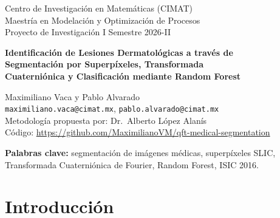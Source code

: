 \documentclass[11pt,a4paper]{article}
\newcommand{\pendiente}[1]{\textcolor{red}{[#1]}}
\newcommand{\RESUMENRESULTADOS}{\pendiente{IoU y Dice promedio pendientes}}
\begin{document}
\begin{center}
  {\large Centro de Investigación en Matemáticas (CIMAT)}\\[2pt]
  Maestría en Modelación y Optimización de Procesos\\[2pt]
  \small Proyecto de Investigación I \hfill Semestre 2026-II\\[14pt]
  {\LARGE\bfseries Identificación de Lesiones Dermatológicas a través de\\[3pt]
   Segmentación por Superpíxeles, Transformada\\[3pt]
   Cuaterniónica y Clasificación mediante Random Forest\par}
  \vspace{12pt}
  Maximiliano Vaca \quad y \quad Pablo Alvarado\\[2pt]
  \small\texttt{maximiliano.vaca@cimat.mx}, \texttt{pablo.alvarado@cimat.mx}\\[2pt]
  \small Metodología propuesta por: Dr.\ Alberto López Alanís\\[2pt]
  \small Código: \url{https://github.com/MaximilianoVM/qft-medical-segmentation}
\end{center}

\begin{abstract}
\noindent
Se presenta un sistema automatizado para segmentar lesiones cutáneas en imágenes
dermatoscópicas. El método divide cada imagen en $k = 85$ superpíxeles con SLIC,
representa el color RGB de cada píxel como un cuaternión puro, aplica la
Transformada Cuaterniónica de Fourier 2D (QFT) sobre cada superpíxel y resume su
espectro en cinco descriptores (magnitud media, desviación estándar, máximo,
energía y entropía). Un clasificador Random Forest decide si cada superpíxel
pertenece a la lesión, y la máscara final se reconstruye a partir de esas
decisiones. Evaluado sobre las 379 imágenes del conjunto oficial de prueba de
ISIC 2016, el sistema obtiene \RESUMENRESULTADOS. El análisis muestra que el
método funciona bien en lesiones de alto contraste y falla cuando la lesión y la
piel tienen tonos parecidos.
\end{abstract}

\noindent\textbf{Palabras clave:} segmentación de imágenes médicas, superpíxeles
SLIC, Transformada Cuaterniónica de Fourier, Random Forest, ISIC 2016.

\section{Introducción}
\end{document}
